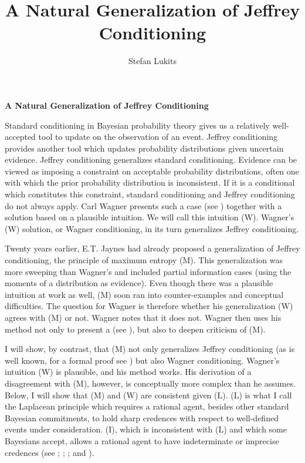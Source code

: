 \documentclass[11pt]{article}
\begin{document}
\title{A Natural Generalization of Jeffrey Conditioning}
\author{Stefan Lukits}
\date{}

\textbf{A Natural Generalization of Jeffrey Conditioning}

Standard conditioning in Bayesian probability theory gives us a
relatively well-accepted tool to update on the observation of an
event. Jeffrey conditioning provides another tool which updates
probability distributions given uncertain evidence. Jeffrey
conditioning generalizes standard conditioning. Evidence can be viewed
as imposing a constraint on acceptable probability distributions,
often one with which the prior probability distribution is
inconsistent. If it is a conditional which constitutes this
constraint, standard conditioning and Jeffrey conditioning do not
always apply. Carl Wagner presents such a case (see
) together with a solution based on a plausible
intuition. We will call this intuition (W). Wagner's (W) solution, or
Wagner conditioning, in its turn generalizes Jeffrey conditioning.

Twenty years earlier, E.T. Jaynes had already proposed a
generalization of Jeffrey conditioning, the principle of maximum
entropy (M). This generalization was more sweeping than Wagner's and
included partial information cases (using the moments of a
distribution as evidence). Even though there was a plausible intuition
at work as well, (M) soon ran into counter-examples and conceptual
difficulties. The question for Wagner is therefore whether his
generalization (W) agrees with (M) or not. Wagner notes that it does
not. Wagner then uses his method not only to present a  (see
), but also to deepen criticism of (M). 

I will show, by contrast, that (M) not only generalizes Jeffrey
conditioning (as is well known, for a formal proof see
) but also Wagner conditioning. Wagner's
intuition (W) is plausible, and his method works. His derivation of a
disagreement with (M), however, is conceptually more complex than he
assumes. Below, I will show that (M) and (W) are consistent given
(L). (L) is what I call the Laplacean principle which requires a
rational agent, besides other standard Bayesian commitments, to hold
sharp credences with respect to well-defined events under
consideration. (I), which is inconsistent with (L) and which some
Bayesians accept, allows a rational agent to have indeterminate or
imprecise credences (see ; ;
; and ).
\end{document}
